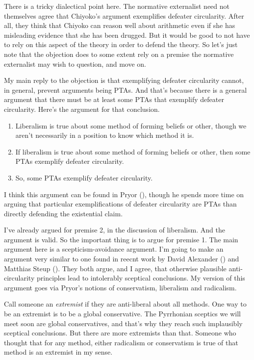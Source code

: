 \documentclass[
  10pt,
  letterpaper,
  twoside]{scrbook}
\providecommand{\tightlist}{%
  \setlength{\itemsep}{0pt}\setlength{\parskip}{0pt}}\usepackage{longtable,booktabs,array}
\begin{document}
There is a tricky dialectical point here. The normative externalist need
not themselves agree that {Chiyoko}'s argument exemplifies defeater
circularity. After all, they think that {Chiyoko} can reason well about
arithmetic even if she has misleading evidence that she has been
drugged. But it would be good to not have to rely on this aspect of the
theory in order to defend the theory. So let's just note that the
objection does to some extent rely on a premise the normative
externalist may wish to question, and move on.

My main reply to the objection is that exemplifying defeater circularity
cannot, in general, prevent arguments being PTAs. And that's because
there is a general argument that there must be at least some PTAs that
exemplify defeater circularity. Here's the argument for that conclusion.

\begin{enumerate}
\def\labelenumi{\arabic{enumi}.}
\tightlist
\item
  Liberalism is true about some method of forming beliefs or other,
  though we aren't necessarily in a position to know which method it is.
\item
  If liberalism is true about some method of forming beliefs or other,
  then some PTAs exemplify defeater circularity.
\item
  So, some PTAs exemplify defeater circularity.
\end{enumerate}

I think this argument can be found in Pryor
(), though he spends more time on arguing
that particular exemplifications of defeater circularity are PTAs than
directly defending the existential claim.

I've already argued for premise 2, in the discussion of liberalism. And
the argument is valid. So the important thing is to argue for premise 1.
The main argument here is a scepticism-avoidance argument. I'm going to
make an argument very similar to one found in reecnt work by David
Alexander () and Matthias Steup
(). They both argue, and I agree, that
otherwise plausible anti-circularity principles lead to intolerably
sceptical conclusions. My version of this argument goes via Pryor's
notions of conservatism, liberalism and radicalism.

Call someone an \emph{extremist} if they are anti-liberal about all
methods. One way to be an extremist is to be a global conservative. The
Pyrrhonian sceptics we will meet soon are global conservatives, and
that's why they reach such implausibly sceptical conclusions. But there
are more extremists than that. Someone who thought that for any method,
either radicalism or conservatism is true of that method is an extremist
in my sense.
\end{document}
